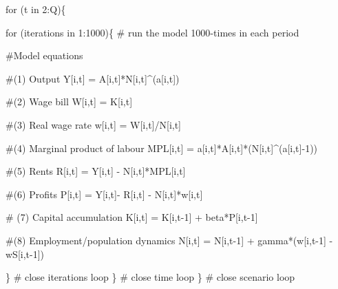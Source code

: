 \documentclass[
  letterpaper,
  DIV=11,
  numbers=noendperiod]{scrreprt}
\newenvironment{Shaded}{\begin{snugshade}}{\end{snugshade}}
\newcommand{\CommentTok}[1]{\textcolor[rgb]{0.37,0.37,0.37}{#1}}
\newcommand{\ControlFlowTok}[1]{\textcolor[rgb]{0.00,0.23,0.31}{#1}}
\newcommand{\DecValTok}[1]{\textcolor[rgb]{0.68,0.00,0.00}{#1}}
\newcommand{\NormalTok}[1]{\textcolor[rgb]{0.00,0.23,0.31}{#1}}
\newcommand{\OtherTok}[1]{\textcolor[rgb]{0.00,0.23,0.31}{#1}}
\newcommand{\SpecialCharTok}[1]{\textcolor[rgb]{0.37,0.37,0.37}{#1}}
\begin{document}
\begin{Shaded}
\begin{Highlighting}[]
  \ControlFlowTok{for}\NormalTok{ (t }\ControlFlowTok{in} \DecValTok{2}\SpecialCharTok{:}\NormalTok{Q)\{}
    
    \ControlFlowTok{for}\NormalTok{ (iterations }\ControlFlowTok{in} \DecValTok{1}\SpecialCharTok{:}\DecValTok{1000}\NormalTok{)\{ }\CommentTok{\# run the model 1000{-}times in each period}
      
    \CommentTok{\#Model equations}
    
    \CommentTok{\#(1) Output}
\NormalTok{    Y[i,t] }\OtherTok{=}\NormalTok{ A[i,t]}\SpecialCharTok{*}\NormalTok{N[i,t]}\SpecialCharTok{\^{}}\NormalTok{(a[i,t])}
    
    \CommentTok{\#(2) Wage bill}
\NormalTok{    W[i,t] }\OtherTok{=}\NormalTok{ K[i,t] }
    
    \CommentTok{\#(3) Real wage rate}
\NormalTok{    w[i,t] }\OtherTok{=}\NormalTok{ W[i,t]}\SpecialCharTok{/}\NormalTok{N[i,t] }
     
    \CommentTok{\#(4) Marginal product of labour}
\NormalTok{    MPL[i,t] }\OtherTok{=}\NormalTok{ a[i,t]}\SpecialCharTok{*}\NormalTok{A[i,t]}\SpecialCharTok{*}\NormalTok{(N[i,t]}\SpecialCharTok{\^{}}\NormalTok{(a[i,t]}\SpecialCharTok{{-}}\DecValTok{1}\NormalTok{))}

    \CommentTok{\#(5) Rents}
\NormalTok{    R[i,t] }\OtherTok{=}\NormalTok{ Y[i,t] }\SpecialCharTok{{-}}\NormalTok{ N[i,t]}\SpecialCharTok{*}\NormalTok{MPL[i,t]}
    
    \CommentTok{\#(6) Profits}
\NormalTok{    P[i,t] }\OtherTok{=}\NormalTok{ Y[i,t]}\SpecialCharTok{{-}}\NormalTok{ R[i,t] }\SpecialCharTok{{-}}\NormalTok{ N[i,t]}\SpecialCharTok{*}\NormalTok{w[i,t]}
    
    \CommentTok{\# (7) Capital accumulation}
\NormalTok{    K[i,t] }\OtherTok{=}\NormalTok{ K[i,t}\DecValTok{{-}1}\NormalTok{] }\SpecialCharTok{+}\NormalTok{ beta}\SpecialCharTok{*}\NormalTok{P[i,t}\DecValTok{{-}1}\NormalTok{]}
    
    \CommentTok{\#(8) Employment/population dynamics  }
\NormalTok{    N[i,t] }\OtherTok{=}\NormalTok{ N[i,t}\DecValTok{{-}1}\NormalTok{] }\SpecialCharTok{+}\NormalTok{ gamma}\SpecialCharTok{*}\NormalTok{(w[i,t}\DecValTok{{-}1}\NormalTok{] }\SpecialCharTok{{-}}\NormalTok{ wS[i,t}\DecValTok{{-}1}\NormalTok{])}
    
\NormalTok{    \} }\CommentTok{\# close iterations loop}
\NormalTok{  \}   }\CommentTok{\# close time loop}
\NormalTok{\}     }\CommentTok{\# close scenario loop}
\end{Highlighting}
\end{Shaded}
\end{document}
